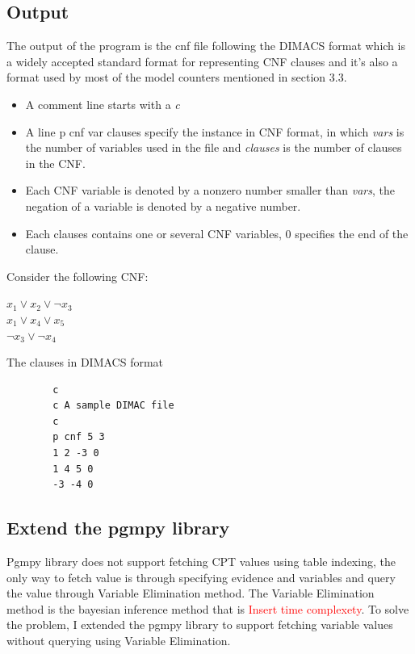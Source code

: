     \subsection{Output}
    The output of the program is the cnf file following the DIMACS format which is a widely accepted standard format for representing CNF clauses and it's also a format used by most of the model counters mentioned in section 3.3.\\
    \begin{itemize}
        \item A comment line starts with a \textit{c}
        \item A line p cnf var clauses specify the instance in CNF format, in which \textit{vars} is the number of variables used in the file and \textit{clauses} is the number of clauses in the CNF.
        \item Each CNF variable is denoted by a non\-zero number smaller than \textit{vars}, the negation of a variable is denoted by a negative number.
        \item Each clauses contains one or several CNF variables, 0 specifies the end of the clause.
    \end{itemize}

    Consider the following CNF:
    \begin{center}
        $x_{1} \vee x_{2} \vee \neg x_{3}$\\
        $x_{1} \vee x_{4} \vee x_{5}$\\
        $\neg x_{3} \vee \neg x_{4}$\\
    \end{center}
    The clauses in DIMACS format\\
    \begin{center}
        \begin{lstlisting}
        c
        c A sample DIMAC file
        c
        p cnf 5 3
        1 2 -3 0
        1 4 5 0
        -3 -4 0
        \end{lstlisting}
    \end{center}

    \subsection{Extend the pgmpy library}
    Pgmpy library does not support fetching CPT values using table indexing, the only way to fetch value is through specifying evidence and variables and query the value through Variable Elimination method. The Variable Elimination method is the bayesian inference method that is \textcolor{red}{Insert time complexety}. To solve the problem, I extended the pgmpy library to support fetching variable values without querying using Variable Elimination.\\

